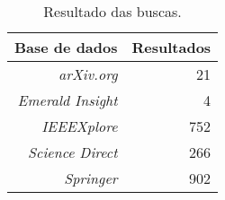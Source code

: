 \begin{table}[!htb]
    \centering
    \caption[Resultado das buscas por artigos nas bases selecionadas]{Resultado das buscas.
    \label{tab:resultadosBuscas1}}
    \begin{tabular}{rr}
        \toprule
           \textbf{Base de dados} & \textbf{Resultados} \\ \hline
        \midrule
            \textit{arXiv.org}              & 21                   \\
		\textit{Emerald Insight}        & 4                   \\
		\textit{IEEEXplore}             & 752                   \\
		\textit{Science Direct}         & 266                   \\
		\textit{Springer}               & 902                   \\ \hline
        \bottomrule
    \end{tabular}
\end{table}